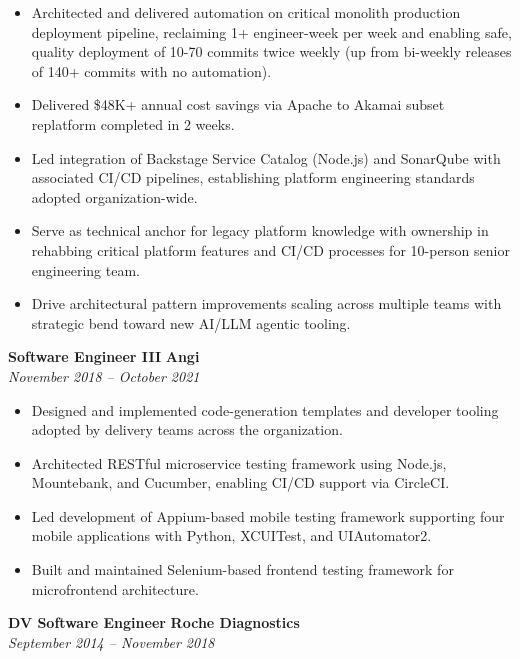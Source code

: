 \documentclass[11pt]{article}
\begin{document}
\begin{itemize}[leftmargin=*,nosep]
\item Architected and delivered automation on critical monolith production deployment pipeline, reclaiming 1+ engineer-week per week and enabling safe, quality deployment of 10-70 commits twice weekly (up from bi-weekly releases of 140+ commits with no automation).
\item Delivered \$48K+ annual cost savings via Apache to Akamai subset replatform completed in 2 weeks.
\item Led integration of Backstage Service Catalog (Node.js) and SonarQube with associated CI/CD pipelines, establishing platform engineering standards adopted organization-wide.
\item Serve as technical anchor for legacy platform knowledge with ownership in rehabbing critical platform features and CI/CD processes for 10-person senior engineering team.
\item Drive architectural pattern improvements scaling across multiple teams with strategic bend toward new AI/LLM agentic tooling.
\end{itemize}

\vspace{6pt}

\textbf{Software Engineer III} \hfill \textbf{Angi}\\
\textit{November 2018 -- October 2021}

\begin{itemize}[leftmargin=*,nosep]
\item Designed and implemented code-generation templates and developer tooling adopted by delivery teams across the organization.
\item Architected RESTful microservice testing framework using Node.js, Mountebank, and Cucumber, enabling CI/CD support via CircleCI.
\item Led development of Appium-based mobile testing framework supporting four mobile applications with Python, XCUITest, and UIAutomator2.
\item Built and maintained Selenium-based frontend testing framework for microfrontend architecture.
\end{itemize}

\vspace{6pt}

\textbf{DV Software Engineer} \hfill \textbf{Roche Diagnostics}\\
\textit{September 2014 -- November 2018}
\end{document}
